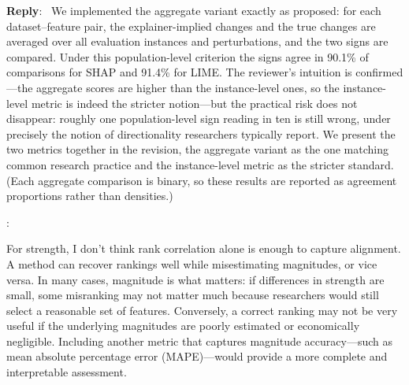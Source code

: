 \documentclass[11pt]{article}
\newcounter{se}[section]
\newcounter{reviewer}
\newcounter{point}[reviewer]
\renewcommand{\thepoint}{R\,\thereviewer.\arabic{point}}
\newenvironment{point}{
    \refstepcounter{point} \bigskip \noindent {\textbf{\thepoint}}: \rmfamily \itshape
}{\medskip}
\newenvironment{reply}
 {\par\medskip \noindent \begin{sf}\textbf{Reply}:\ }
 {\medskip \end{sf}}
\begin{document}
\begin{reply}
{\color{red}
We implemented the aggregate variant exactly as proposed: for each dataset--feature pair, the explainer-implied changes and the true changes are averaged over all evaluation instances and perturbations, and the two signs are compared. Under this population-level criterion the signs agree in 90.1\% of comparisons for SHAP and 91.4\% for LIME. The reviewer's intuition is confirmed---the aggregate scores are higher than the instance-level ones, so the instance-level metric is indeed the stricter notion---but the practical risk does not disappear: roughly one population-level sign reading in ten is still wrong, under precisely the notion of directionality researchers typically report. We present the two metrics together in the revision, the aggregate variant as the one matching common research practice and the instance-level metric as the stricter standard. (Each aggregate comparison is binary, so these results are reported as agreement proportions rather than densities.)
}
\end{reply}


\begin{point}
For strength, I don't think rank correlation alone is enough to capture alignment. A method can recover rankings well while misestimating magnitudes, or vice versa. In many cases, magnitude is what matters: if differences in strength are small, some misranking may not matter much because researchers would still select a reasonable set of features. Conversely, a correct ranking may not be very useful if the underlying magnitudes are poorly estimated or economically negligible. Including another metric that captures magnitude accuracy---such as mean absolute percentage error (MAPE)---would provide a more complete and interpretable assessment.
\end{point}
\end{document}
